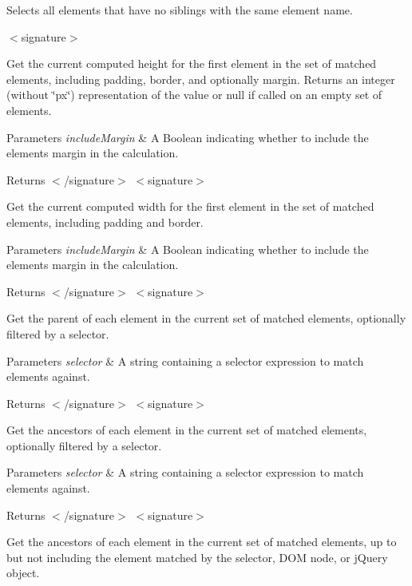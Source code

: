 Selects all elements that have no siblings with the same element name.

$<$signature$>$ 

Get the current computed height for the first element in the set of matched elements, including padding, border, and optionally margin. Returns an integer (without \char`\"{}px\char`\"{}) representation of the value or null if called on an empty set of elements.


\begin{DoxyParams}{Parameters}
{\em include\+Margin} & A Boolean indicating whether to include the element\textquotesingle{}s margin in the calculation.\\
\hline
\end{DoxyParams}
\begin{DoxyReturn}{Returns}
$<$/signature$>$ $<$signature$>$ 

Get the current computed width for the first element in the set of matched elements, including padding and border.
\end{DoxyReturn}

\begin{DoxyParams}{Parameters}
{\em include\+Margin} & A Boolean indicating whether to include the element\textquotesingle{}s margin in the calculation.\\
\hline
\end{DoxyParams}
\begin{DoxyReturn}{Returns}
$<$/signature$>$ $<$signature$>$ 

Get the parent of each element in the current set of matched elements, optionally filtered by a selector.
\end{DoxyReturn}

\begin{DoxyParams}{Parameters}
{\em selector} & A string containing a selector expression to match elements against.\\
\hline
\end{DoxyParams}
\begin{DoxyReturn}{Returns}
$<$/signature$>$ $<$signature$>$ 

Get the ancestors of each element in the current set of matched elements, optionally filtered by a selector.
\end{DoxyReturn}

\begin{DoxyParams}{Parameters}
{\em selector} & A string containing a selector expression to match elements against.\\
\hline
\end{DoxyParams}
\begin{DoxyReturn}{Returns}
$<$/signature$>$ $<$signature$>$ 

Get the ancestors of each element in the current set of matched elements, up to but not including the element matched by the selector, D\+OM node, or j\+Query object.
\end{DoxyReturn}

